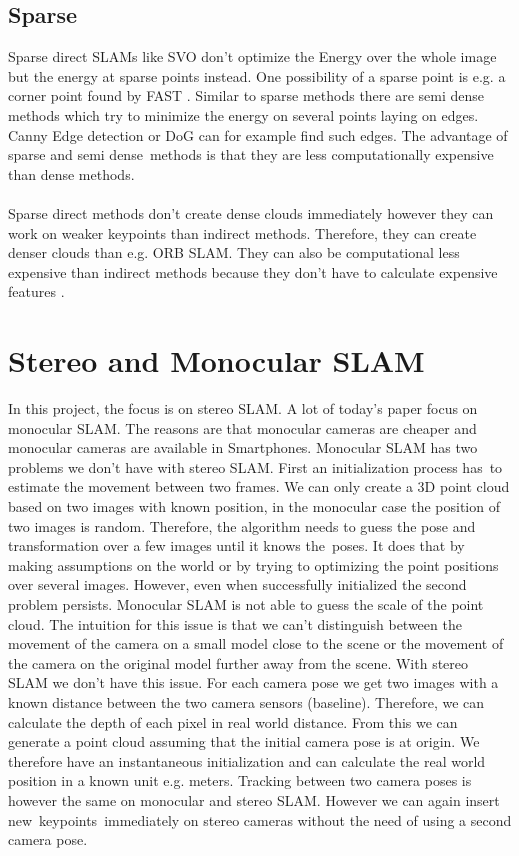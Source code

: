 \documentclass[11pt,a4paper,titlepage,oneside]{report}
\begin{document}
\subsection{Sparse}

Sparse direct SLAMs like SVO \cite{svo} don’t optimize the Energy over the whole image but the energy at sparse points instead. One possibility of a sparse point is e.g. a corner point found by FAST \cite{fast}. Similar to sparse methods there are semi dense methods which try to minimize the energy on several points laying on edges. Canny Edge detection or DoG can for example find such edges. The advantage of sparse and semi dense methods is that they are less computationally expensive than dense methods.\\\\
Sparse direct methods don’t create dense clouds immediately however they can work on weaker keypoints than indirect methods. Therefore, they can create denser clouds than e.g. ORB SLAM. They can also be computational less expensive than indirect methods because they don’t have to calculate expensive features \cite{svo}.

\section{Stereo and Monocular SLAM}

In this project, the focus is on stereo SLAM. A lot of today's paper focus on monocular SLAM. The reasons are that monocular cameras are cheaper and monocular cameras are available in Smartphones. Monocular SLAM has two problems we don’t have with stereo SLAM. First an initialization process has to estimate the movement between two frames. We can only create a 3D point cloud based on two images with known position, in the monocular case the position of two images is random. Therefore, the algorithm needs to guess the pose and transformation over a few images until it knows the poses. It does that by making assumptions on the world or by trying to optimizing the point positions over several images. However, even when successfully initialized the second problem persists. Monocular SLAM is not able to guess the scale of the point cloud. The intuition for this issue is that we can’t distinguish between the movement of the camera on a small model close to the scene or the movement of the camera on the original model further away from the scene. With stereo SLAM we don’t have this issue. For each camera pose we get two images with a known distance between the two camera sensors (baseline). Therefore, we can calculate the depth of each pixel in real world distance. From this we can generate a point cloud assuming that the initial camera pose is at origin. We therefore have an instantaneous initialization and can calculate the real world position in a known unit e.g. meters. Tracking between two camera poses is however the same on monocular and stereo SLAM. However we can again insert new keypoints immediately on stereo cameras without the need of using a second camera pose.
\end{document}
